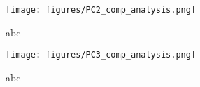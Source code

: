 \documentclass{article}
\begin{document}
	\begin{figure}[ht]
		\begin{center} 
		\centering
			\texttt{[image: figures/PC2\_comp\_analysis.png]}
			\caption{abc}
			\end{center}
		\end{figure}

	\begin{figure}[ht]
		\begin{center} 
		\centering
			\texttt{[image: figures/PC3\_comp\_analysis.png]}
			\caption{abc}
			\end{center}
		\end{figure}




    

   
\end{document}
